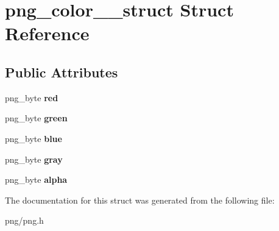 \hypertarget{structpng__color__8__struct}{}\section{png\+\_\+color\+\_\+\_\+struct Struct Reference}
\label{structpng__color__8__struct}
\subsection*{Public Attributes}
\begin{DoxyCompactItemize}
\item 
png\+\_\+byte {\bfseries red}\hypertarget{structpng__color__8__struct_a5cd91bb4b3429256b84e6f28c72778b8}{}\label{structpng__color__8__struct_a5cd91bb4b3429256b84e6f28c72778b8}

\item 
png\+\_\+byte {\bfseries green}\hypertarget{structpng__color__8__struct_a40d053224177df35c037525b39563b05}{}\label{structpng__color__8__struct_a40d053224177df35c037525b39563b05}

\item 
png\+\_\+byte {\bfseries blue}\hypertarget{structpng__color__8__struct_a58225d3b6426185d5a40d3c9935db96a}{}\label{structpng__color__8__struct_a58225d3b6426185d5a40d3c9935db96a}

\item 
png\+\_\+byte {\bfseries gray}\hypertarget{structpng__color__8__struct_a574edc173d956cca144927262e88653e}{}\label{structpng__color__8__struct_a574edc173d956cca144927262e88653e}

\item 
png\+\_\+byte {\bfseries alpha}\hypertarget{structpng__color__8__struct_af1c7203aefe12bd35dc9a4cdd58e7a4b}{}\label{structpng__color__8__struct_af1c7203aefe12bd35dc9a4cdd58e7a4b}

\end{DoxyCompactItemize}


The documentation for this struct was generated from the following file\+:\begin{DoxyCompactItemize}
\item 
png/png.\+h\end{DoxyCompactItemize}
